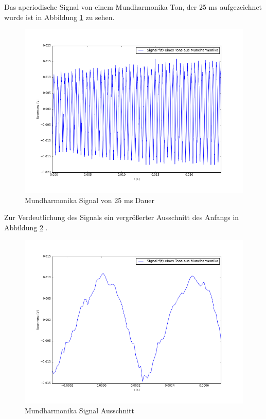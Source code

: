 \documentclass[12pt,oneside,a4paper]{report}
\begin{document}
Das aperiodische Signal von einem Mundharmonika Ton, der 25 ms aufgezeichnet wurde ist in Abbildung \ref{fig:SignalKomplet} zu sehen.

\begin{figure}[H]
	\centering\small
	\includegraphics[width=\textwidth]{src/V1_Signal_komplet.png}
	\caption{Mundharmonika Signal von 25 ms Dauer}
	\label{fig:SignalKomplet}
\end{figure}

Zur Verdeutlichung des Signals ein vergrößerter Ausschnitt des Anfangs in Abbildung \ref{fig:SignalAusschnitt} .

\begin{figure}[H]
	\centering\small
	\includegraphics[width=\textwidth]{src/V1_Signal_grundfrequenz.png}
	\caption{Mundharmonika Signal Ausschnitt}
	\label{fig:SignalAusschnitt}
\end{figure}
\end{document}
